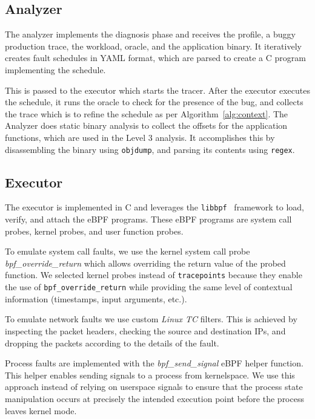 \subsection{Analyzer}
The analyzer implements the diagnosis phase and receives the profile, a buggy production trace, the workload, oracle, and the application binary.
It iteratively creates fault schedules in YAML format, which are parsed to create a C program implementing the schedule.

This is passed to the executor which starts the tracer.
After the executor executes the schedule, it runs the oracle to check for the presence of the bug, and collects the trace which is to refine the schedule as per Algorithm~\ref{alg:context}.
The Analyzer does static binary analysis to collect the offsets for the application functions, which are used in the Level 3 analysis.
It accomplishes this by disassembling the binary using \texttt{objdump}, and parsing its contents using \texttt{regex}.

\subsection{Executor}
The executor is implemented in C and leverages the \texttt{libbpf}~\cite{libbpf} framework to load, verify, and attach the eBPF programs.
These eBPF programs are system call probes, kernel probes, and user function probes.

To emulate system call faults, we use the kernel system call probe \textit{bpf\_override\_return} which allows overriding the return value of the probed function.
We selected kernel probes instead of \texttt{tracepoints} because they enable the use of \texttt{bpf\_override\_return} while providing the same level of contextual information (timestamps, input arguments, etc.).

To emulate network faults we use custom \textit{Linux TC} filters.
This is achieved by inspecting the packet headers, checking the source and destination IPs, and dropping the packets according to the details of the fault.

Process faults are implemented with the \textit{bpf\_send\_signal} eBPF helper function.
This helper enables sending signals to a process from kernelspace.
We use this approach instead of relying on userspace signals to ensure that the process state manipulation occurs at precisely the intended execution point before the process leaves kernel mode.

